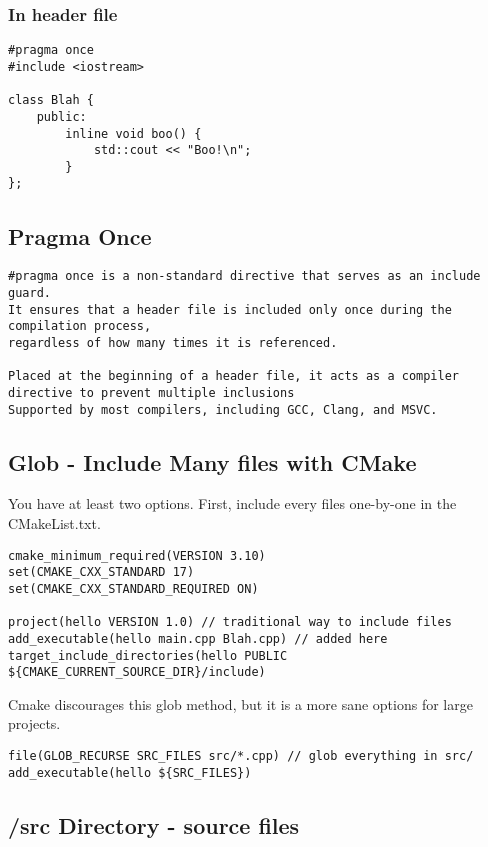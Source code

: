 \subsubsection{In header file}

\begin{verbatim}
#pragma once
#include <iostream>

class Blah {
    public:
        inline void boo() {
            std::cout << "Boo!\n";
        }
};
\end{verbatim}

\subsection{Pragma Once}

\begin{verbatim}
#pragma once is a non-standard directive that serves as an include guard. 
It ensures that a header file is included only once during the compilation process,
regardless of how many times it is referenced.

Placed at the beginning of a header file, it acts as a compiler directive to prevent multiple inclusions
Supported by most compilers, including GCC, Clang, and MSVC.
\end{verbatim}

\subsection{Glob - Include Many files with CMake}
 
You have at least two options. First, include every files one-by-one in the CMakeList.txt.
\begin{verbatim}
cmake_minimum_required(VERSION 3.10)
set(CMAKE_CXX_STANDARD 17)
set(CMAKE_CXX_STANDARD_REQUIRED ON)

project(hello VERSION 1.0) // traditional way to include files
add_executable(hello main.cpp Blah.cpp) // added here
target_include_directories(hello PUBLIC ${CMAKE_CURRENT_SOURCE_DIR}/include)
\end{verbatim}

Cmake discourages this glob method, but it is a more sane options for large projects.

\begin{verbatim}
file(GLOB_RECURSE SRC_FILES src/*.cpp) // glob everything in src/
add_executable(hello ${SRC_FILES})
\end{verbatim}

\subsection{/src Directory - source files}


